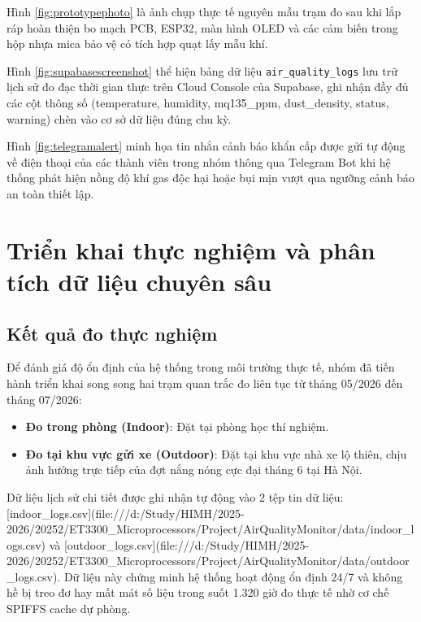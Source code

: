 Hình \ref{fig:prototypephoto} là ảnh chụp thực tế nguyên mẫu trạm đo sau khi lắp ráp hoàn thiện bo mạch PCB, ESP32, màn hình OLED và các cảm biến trong hộp nhựa mica bảo vệ có tích hợp quạt lấy mẫu khí.

Hình \ref{fig:supabasescreenshot} thể hiện bảng dữ liệu \texttt{air\_quality\_logs} lưu trữ lịch sử đo đạc thời gian thực trên Cloud Console của Supabase, ghi nhận đầy đủ các cột thông số (temperature, humidity, mq135\_ppm, dust\_density, status, warning) chèn vào cơ sở dữ liệu đúng chu kỳ.

Hình \ref{fig:telegramalert} minh họa tin nhắn cảnh báo khẩn cấp được gửi tự động về điện thoại của các thành viên trong nhóm thông qua Telegram Bot khi hệ thống phát hiện nồng độ khí gas độc hại hoặc bụi mịn vượt qua ngưỡng cảnh báo an toàn thiết lập.

\section{Triển khai thực nghiệm và phân tích dữ liệu chuyên sâu}
\subsection{Kết quả đo thực nghiệm}
Để đánh giá độ ổn định của hệ thống trong môi trường thực tế, nhóm đã tiến hành triển khai song song hai trạm quan trắc đo liên tục từ tháng 05/2026 đến tháng 07/2026:
\begin{itemize}
    \item \textbf{Đo trong phòng (Indoor)}: Đặt tại phòng học thí nghiệm.
    \item \textbf{Đo tại khu vực gửi xe (Outdoor)}: Đặt tại khu vực nhà xe lộ thiên, chịu ảnh hưởng trực tiếp của đợt nắng nóng cực đại tháng 6 tại Hà Nội.
\end{itemize}

Dữ liệu lịch sử chi tiết được ghi nhận tự động vào 2 tệp tin dữ liệu: [indoor\_logs.csv](file:///d:/Study/HIMH/2025-2026/20252/ET3300\_Microprocessors/Project/AirQualityMonitor/data/indoor\_logs.csv) và [outdoor\_logs.csv](file:///d:/Study/HIMH/2025-2026/20252/ET3300\_Microprocessors/Project/AirQualityMonitor/data/outdoor\_logs.csv). Dữ liệu này chứng minh hệ thống hoạt động ổn định 24/7 và không hề bị treo đơ hay mất mát số liệu trong suốt 1.320 giờ đo thực tế nhờ cơ chế SPIFFS cache dự phòng.

